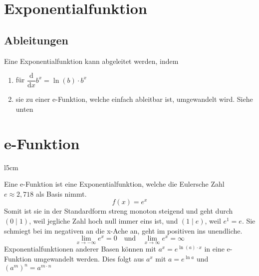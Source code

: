 \documentclass{article}
\begin{document}
  
\section{Exponentialfunktion}
\subsection{Ableitungen}
Eine Exponentialfunktion kann abgeleitet werden, indem
\begin{enumerate}
 \item für $\dfrac{\mathrm{d}}{\mathrm{d}x} b^x = \ln{(b)} \cdot b^x$
 \item sie zu einer e-Funktion, welche einfach ableitbar ist, umgewandelt wird. Siehe unten 
\end{enumerate} 
 
\section{e-Funktion}
\begin{wrapfigure}{l}{5cm}
 \centering
\end{wrapfigure}  
Eine e-Funktion ist eine Exponentialfunktion, welche die Eulersche Zahl $e \approx 2,718$ als Basis nimmt.
\[
 f(x)=e^x
\]
Somit ist sie in der Standardform streng monoton steigend und geht durch ${(0 \mid 1)}$, weil jegliche Zahl hoch null immer eins ist, und $(1 \mid e)$, weil $e^1=e$. \newline
Sie schmiegt bei im negativen an die x-Ache an, geht im positiven ins unendliche.
\[
 \lim_{x \to -\infty} e^x = 0
 \quad \text{und} \quad
 \lim_{x \to \infty} e^x = \infty
\]
Exponentialfunktionen anderer Basen können mit $a^x = e^{\ln{(a)} \cdot x}$ in eine e-Funktion umgewandelt werden. Dies folgt aus $a^x$ mit $a=e^{\ln{a}}$ und $(a^m)^n = a^{m \cdot n}$ 
\end{document}

